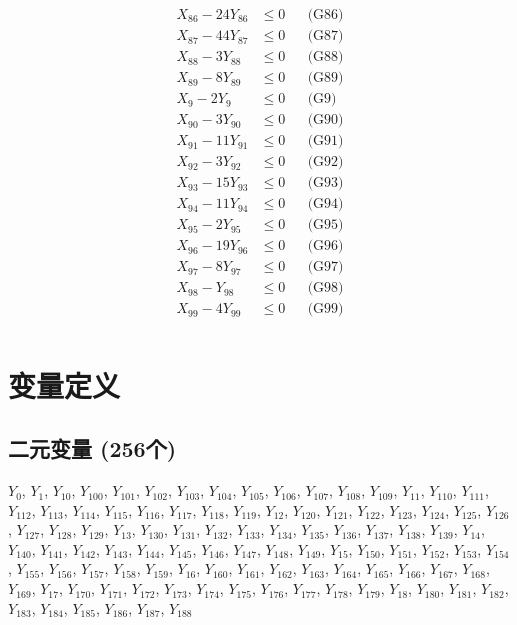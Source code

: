 \documentclass[a4paper,10pt]{article}
\begin{document}
{\begin{align}
X_{86} - 24Y_{86} &\leq 0 && \text{(G86)} \\
X_{87} - 44Y_{87} &\leq 0 && \text{(G87)} \\
X_{88} - 3Y_{88} &\leq 0 && \text{(G88)} \\
X_{89} - 8Y_{89} &\leq 0 && \text{(G89)} \\
X_{9} - 2Y_{9} &\leq 0 && \text{(G9)} \\
X_{90} - 3Y_{90} &\leq 0 && \text{(G90)} \\
X_{91} - 11Y_{91} &\leq 0 && \text{(G91)} \\
X_{92} - 3Y_{92} &\leq 0 && \text{(G92)} \\
X_{93} - 15Y_{93} &\leq 0 && \text{(G93)} \\
X_{94} - 11Y_{94} &\leq 0 && \text{(G94)} \\
X_{95} - 2Y_{95} &\leq 0 && \text{(G95)} \\
X_{96} - 19Y_{96} &\leq 0 && \text{(G96)} \\
X_{97} - 8Y_{97} &\leq 0 && \text{(G97)} \\
X_{98} - Y_{98} &\leq 0 && \text{(G98)} \\
X_{99} - 4Y_{99} &\leq 0 && \text{(G99)} \\
\end{align}}

\section{变量定义}

\subsection{二元变量 (256个)}

{\small $Y_{0}$, $Y_{1}$, $Y_{10}$, $Y_{100}$, $Y_{101}$, $Y_{102}$, $Y_{103}$, $Y_{104}$, $Y_{105}$, $Y_{106}$, $Y_{107}$, $Y_{108}$, $Y_{109}$, $Y_{11}$, $Y_{110}$, $Y_{111}$, $Y_{112}$, $Y_{113}$, $Y_{114}$, $Y_{115}$, $Y_{116}$, $Y_{117}$, $Y_{118}$, $Y_{119}$, $Y_{12}$, $Y_{120}$, $Y_{121}$, $Y_{122}$, $Y_{123}$, $Y_{124}$, $Y_{125}$, $Y_{126}$, $Y_{127}$, $Y_{128}$, $Y_{129}$, $Y_{13}$, $Y_{130}$, $Y_{131}$, $Y_{132}$, $Y_{133}$, $Y_{134}$, $Y_{135}$, $Y_{136}$, $Y_{137}$, $Y_{138}$, $Y_{139}$, $Y_{14}$, $Y_{140}$, $Y_{141}$, $Y_{142}$, $Y_{143}$, $Y_{144}$, $Y_{145}$, $Y_{146}$, $Y_{147}$, $Y_{148}$, $Y_{149}$, $Y_{15}$, $Y_{150}$, $Y_{151}$, $Y_{152}$, $Y_{153}$, $Y_{154}$, $Y_{155}$, $Y_{156}$, $Y_{157}$, $Y_{158}$, $Y_{159}$, $Y_{16}$, $Y_{160}$, $Y_{161}$, $Y_{162}$, $Y_{163}$, $Y_{164}$, $Y_{165}$, $Y_{166}$, $Y_{167}$, $Y_{168}$, $Y_{169}$, $Y_{17}$, $Y_{170}$, $Y_{171}$, $Y_{172}$, $Y_{173}$, $Y_{174}$, $Y_{175}$, $Y_{176}$, $Y_{177}$, $Y_{178}$, $Y_{179}$, $Y_{18}$, $Y_{180}$, $Y_{181}$, $Y_{182}$, $Y_{183}$, $Y_{184}$, $Y_{185}$, $Y_{186}$, $Y_{187}$, $Y_{188}$}
\end{document}
